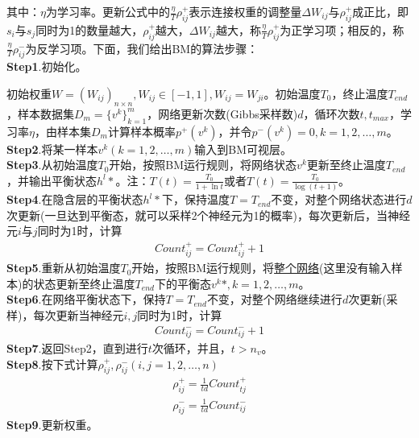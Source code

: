 {            其中：$\eta$为学习率。更新公式中的$\frac{\eta}{T}\rho_{ij}^+$表示连接权重的调整量$\Delta W_{ij}$与$\rho_{ij}^+$成正比，即$s_i$与$s_j$同时为1的数量越大，$\rho_{ij}^+$越大，$\Delta W_{ij}$越大，称$\frac{\eta}{T}\rho_{ij}^+$为正学习项；相反的，称$\frac{\eta}{T}\rho_{ij}^-$为反学习项。下面，我们给出BM的算法步骤：\\
            \textbf{Step1}.初始化。
            \par
            初始权重$W=(W_{ij})_{n\times n},W_{ij}\in [-1,1],W_{ij} = W_{ji}$。初始温度$T_0$，终止温度$T_{end}$，样本数据集$D_m = \{v^k\}_{k=1}^m$，网络更新次数(Gibbs采样数)$d$，循环次数$t,t_{max}$，学习率$\eta$，由样本集$D_m$计算样本概率$p^+(v^k)$，并令$p^-(v^k) = 0,k=1,2,\dots,m$。\\
            \textbf{Step2}.将某一样本$v^k(k=1,2,\dots,m)$输入到BM可视层。\\
            \textbf{Step3}.从初始温度$T_0$开始，按照BM运行规则，将网络状态$v^k$更新至终止温度$T_{end}$，并输出平衡状态$h^l*$。注：$T(t) = \frac{T_0}{1+\ln t}$或者$T(t) = \frac{T_0}{\log (t+1)}$。 \\
            \textbf{Step4}.在隐含层的平衡状态$h^l*$下，保持温度$T= T_{end}$不变，对整个网络状态进行$d$次更新(一旦达到平衡态，就可以采样2个神经元为1的概率)，每次更新后，当神经元$i$与$j$同时为1时，计算
            \begin{align*}
            Count_{ij}^+ = Count_{ij}^+ +1
            \end{align*}
            \textbf{Step5}.重新从初始温度$T_0$开始，按照BM运行规则，将\underline{整个网络}(这里没有输入样本)的状态更新至终止温度$T_{end}$下的平衡态$v^k*,k=1,2,\dots,m$。\\
            \textbf{Step6}.在网络平衡状态下，保持$T= T_{end}$不变，对整个网络继续进行$d$次更新(采样)，每次更新当神经元$i,j$同时为1时，计算
            \begin{align*}
            Count_{ij}^- = Count_{ij}^-+1
            \end{align*}
            \textbf{Step7}.返回Step2，直到进行$t$次循环，并且，$t>n_v$。\\
            \textbf{Step8}.按下式计算$\rho_{ij}^+,\rho_{ij}^-(i,j=1,2,\dots,n)$
            \begin{align*}
            \rho_{ij}^+ = \frac{1}{td} Count_{tj}^+\\
            \rho_{ij}^- = \frac{1}{td} Count_{ij}^-
            \end{align*}
            \textbf{Step9}.更新权重。
            \begin{align*}

\end{align*}}
